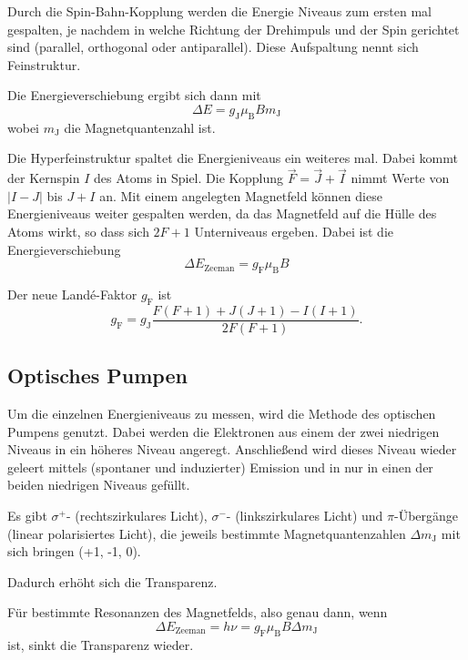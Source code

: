 Durch die Spin-Bahn-Kopplung werden die Energie Niveaus zum ersten mal gespalten, je nachdem in welche Richtung der Drehimpuls und der Spin gerichtet sind (parallel, orthogonal oder antiparallel).
Diese Aufspaltung nennt sich Feinstruktur. 

Die Energieverschiebung ergibt sich dann mit 
\begin{equation*}
    \Delta E = g_\text{J} \mu_\text{B} B m_\text{J}
\end{equation*}
wobei $m_\text{J}$ die Magnetquantenzahl ist.

Die Hyperfeinstruktur spaltet die Energieniveaus ein weiteres mal. 
Dabei kommt der Kernspin $I$ des Atoms in Spiel.
Die Kopplung $\vec F = \vec J + \vec I$ nimmt Werte von $| I - J|$ bis $J+I$ an. 
Mit einem angelegten Magnetfeld können diese Energieniveaus weiter gespalten werden, da das Magnetfeld auf die Hülle des Atoms wirkt, so dass sich $2F+1$ Unterniveaus ergeben. 
Dabei ist die Energieverschiebung 
\begin{equation*}
    \Delta E_\text{Zeeman} = g_\text{F} \mu_\text{B} B
\end{equation*}

Der neue Landé-Faktor $g_\text{F}$ ist 
\begin{equation*}
    g_\text{F} = g_\text{J} \frac{F(F+1) + J(J+1) - I(I+1)}{2F(F+1)}.
\end{equation*}

\subsection{Optisches Pumpen}

Um die einzelnen Energieniveaus zu messen, wird die Methode des optischen Pumpens genutzt. Dabei werden die Elektronen aus einem der zwei niedrigen Niveaus in ein höheres Niveau angeregt. 
Anschließend wird dieses Niveau wieder geleert mittels (spontaner und induzierter) Emission und in nur in einen der beiden niedrigen Niveaus gefüllt. 

Es gibt $\sigma^+$- (rechtszirkulares Licht), $\sigma^-$- (linkszirkulares Licht) und $\pi$-Übergänge (linear polarisiertes Licht), die jeweils bestimmte Magnetquantenzahlen $\Delta m_\text{J}$ mit sich bringen (+1, -1, 0).


Dadurch erhöht sich die Transparenz. 

Für bestimmte Resonanzen des Magnetfelds, also genau dann, wenn 
\begin{equation}
    \Delta E_\text{Zeeman} = h \nu = g_\text{F} \mu_\text{B} B \Delta m_\text{J}
    \label{eq:Zeeman}
\end{equation}
ist, sinkt die Transparenz wieder.

